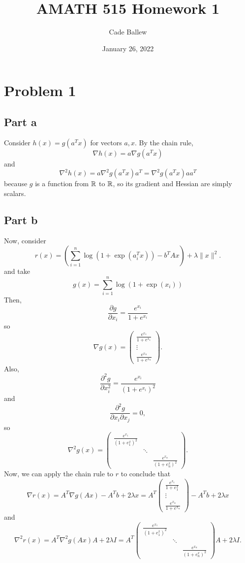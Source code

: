 \documentclass{article}
\title{AMATH 515 Homework 1}
\author{Cade Ballew}
\date{January 26, 2022}
\begin{document}
\maketitle
\section{Problem 1}
\subsection{Part a}
Consider $h(x)=g(a^Tx)$ for vectors $a,x$. By the chain rule,
\[
\nabla h(x)=a\nabla g(a^T x) 
\]
and 
\[
\nabla^2 h(x)=a\nabla^2 g(a^T x)a^T= \nabla^2 g(a^T x)aa^T
\]
because $g$ is a function from $\mathbb{R}$ to $\mathbb{R}$, so its gradient and Hessian are simply scalars. 
\subsection{Part b}
Now, consider \[
r(x)=\left(\sum_{i=1}^n \log(1+\exp(a_i^Tx))- b^TAx\right) + \lambda \|x\|^2.
\]
and take 
\[
g(x)=\sum_{i=1}^n \log(1+\exp(x_i))
\]
Then, 
\[
\frac{\partial g}{\partial x_i}=\frac{e^{x_i}}{1+e^{x_i}}
\]
so
\[
\nabla g(x)=\begin{pmatrix}\frac{e^{x_1}}{1+e^{x_1}}\\\vdots\\\frac{e^{x_n}}{1+e^{x_n}}\end{pmatrix}.
\]
Also, 
\[
\frac{\partial^2 g}{\partial x_i^2}=\frac{e^{x_i}}{(1+e^{x_i})^2}
\]
and 
\[
\frac{\partial^2 g}{\partial x_i\partial x_j}=0,
\]
so 
\[
\nabla^2 g(x)=
\begin{pmatrix}
\frac{e^{x_1}}{(1+e^x_1)^2}\\
& \ddots\\
&& \frac{e^{x_n}}{(1+e^x_n)^2}
\end{pmatrix}.
\]
Now, we can apply the chain rule to $r$ to conclude that 
\[
\nabla r(x)=A^T\nabla g(Ax)-A^Tb+2\lambda x=A^T\begin{pmatrix}\frac{e^{x_1}}{1+e^x_1}\\\vdots\\\frac{e^{x_n}}{1+e^{x_n}}\end{pmatrix}-A^Tb+2\lambda x
\]
and 
\[
\nabla^2 r(x)=A^T\nabla^2g(Ax)A+2\lambda I=A^T\begin{pmatrix}
\frac{e^{x_1}}{(1+e^x_1)^2}\\
& \ddots\\
&& \frac{e^{x_n}}{(1+e^x_n)^2}
\end{pmatrix}A+2\lambda I.
\]
\end{document}
